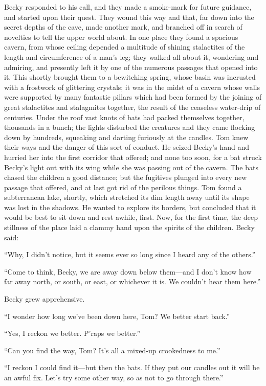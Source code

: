 \documentclass{book}
\begin{document}
Becky responded to his call, and they made a smoke-mark for future guidance, and started upon their quest. They wound this way and that, far down into the secret depths of the cave, made another mark, and branched off in search of novelties to tell the upper world about. In one place they found a spacious cavern, from whose ceiling depended a multitude of shining stalactites of the length and circumference of a man’s leg; they walked all about it, wondering and admiring, and presently left it by one of the numerous passages that opened into it. This shortly brought them to a bewitching spring, whose basin was incrusted with a frostwork of glittering crystals; it was in the midst of a cavern whose walls were supported by many fantastic pillars which had been formed by the joining of great stalactites and stalagmites together, the result of the ceaseless water-drip of centuries. Under the roof vast knots of bats had packed themselves together, thousands in a bunch; the lights disturbed the creatures and they came flocking down by hundreds, squeaking and darting furiously at the candles. Tom knew their ways and the danger of this sort of conduct. He seized Becky’s hand and hurried her into the first corridor that offered; and none too soon, for a bat struck Becky’s light out with its wing while she was passing out of the cavern. The bats chased the children a good distance; but the fugitives plunged into every new passage that offered, and at last got rid of the perilous things. Tom found a subterranean lake, shortly, which stretched its dim length away until its shape was lost in the shadows. He wanted to explore its borders, but concluded that it would be best to sit down and rest awhile, first. Now, for the first time, the deep stillness of the place laid a clammy hand upon the spirits of the children. Becky said:

“Why, I didn’t notice, but it seems ever so long since I heard any of the others.”

“Come to think, Becky, we are away down below them—and I don’t know how far away north, or south, or east, or whichever it is. We couldn’t hear them here.”

Becky grew apprehensive.

“I wonder how long we’ve been down here, Tom? We better start back.”

“Yes, I reckon we better. P’raps we better.”

“Can you find the way, Tom? It’s all a mixed-up crookedness to me.”

“I reckon I could find it—but then the bats. If they put our candles out it will be an awful fix. Let’s try some other way, so as not to go through there.”
\end{document}
